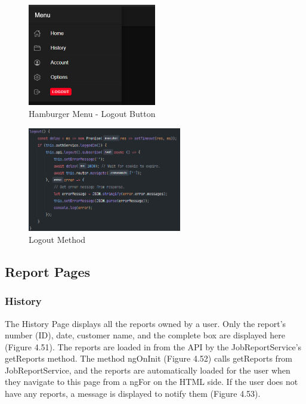 \begin{figure}[H]
    \caption{Hamburger Menu - Logout Button}
    \label{image:logoutButton}
    \centering
    \includegraphics[width=0.5\textwidth]{images/repota/UI/logout.png}
\end{figure}

\begin{figure}[H]
    \caption{Logout Method}
    \label{image:logoutMethod}
    \centering
    \includegraphics[width=0.6\textwidth]{images/repota/account_pages/logout_method.png}
\end{figure}

\subsection{Report Pages}

\subsubsection{History}
The History Page displays all the reports owned by a user. Only the report's number (ID), date, customer name, and the complete box are displayed here (Figure 4.51). The reports are loaded in from the API by the JobReportService's getReports method. The method ngOnInit (Figure 4.52) calls getReports from JobReportService, and the reports are automatically loaded for the user when they navigate to this page from a ngFor on the HTML side. If the user does not have any reports, a message is displayed to notify them (Figure 4.53). 


